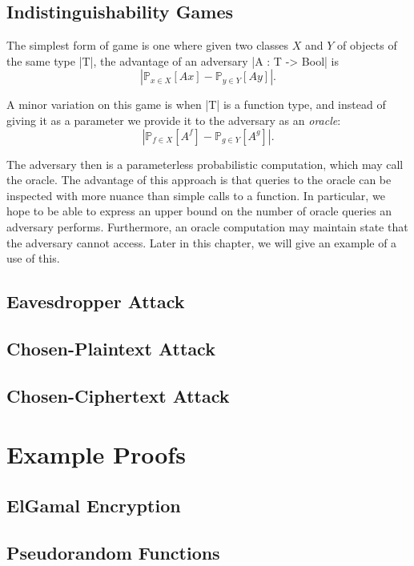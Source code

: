 \subsection{Indistinguishability Games}

The simplest form of game is one where given two classes $X$ and $Y$ of objects of the same type |T|, the
advantage of an adversary |A : T -> Bool| is
\[
    |\mathbb{P}_{x \in X}[ A x ] - \mathbb{P}_{y \in Y}[ A y ]|.
\]

A minor variation on this game is when |T| is a function type, and instead of giving it as a parameter we provide it to
the adversary as an \emph{oracle}:
\[
    |\mathbb{P}_{f \in X}[ A^f ] - \mathbb{P}_{g \in Y}[ A^g ]|.
\]

The adversary then is a parameterless probabilistic computation, which may call the oracle.  The advantage of this
approach is that queries to the oracle can be inspected with more nuance than simple calls to a function.  In
particular, we hope to be able to express an upper bound on the number of oracle queries an adversary performs.
Furthermore, an oracle computation may maintain state that the adversary cannot access.  Later in this chapter, we will
give an example of a use of this.



\subsection{Eavesdropper Attack}

\subsection{Chosen-Plaintext Attack}

\subsection{Chosen-Ciphertext Attack}

\section{Example Proofs}

\subsection{ElGamal Encryption}

\subsection{Pseudorandom Functions}

